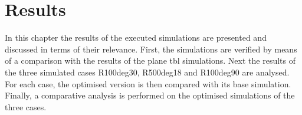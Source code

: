 \chapter{Results}


In this chapter the results of the executed simulations are presented and discussed in terms of their relevance.
First, the simulations are verified by means of  a comparison with the results of the plane \acrshort{tbl} simulations.
Next the results of the three simulated cases R100deg30, R500deg18 and R100deg90 are analysed. For each case, the optimised version is then  compared with its base simulation.
Finally, a comparative analysis is performed on the optimised simulations of the three cases.



